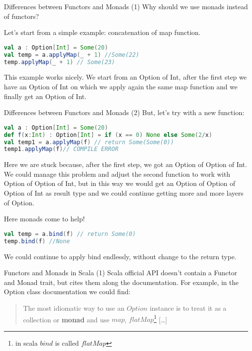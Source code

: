 \begin{frame}[fragile]{Differences between Functors and Monads (1)}
	Why should we use monads instead of functors?
	
	Let's start from a simple example: concatenation of map function.
\begin{lstlisting}[language=scala]
val a : Option[Int] = Some(20)
val temp = a.applyMap(_ + 1) //Some(22)
temp.applyMap(_ + 1) // Some(23)
\end{lstlisting}				
	This example works nicely. We start from an Option of Int, after the first step we have an Option of Int on which we apply again 
	the same map function and we finally get an Option of Int.
\end{frame}

\begin{frame}[fragile]{Differences between Functors and Monads (2)}
	But, let's try with a new function:
\begin{lstlisting}[language=scala]
val a : Option[Int] = Some(20)		
def f(x:Int) : Option[Int] = if (x == 0) None else Some(2/x)
val temp1 = a.applyMap(f) // return Some(Some(0))
temp1.applyMap(f)// COMPILE ERROR
\end{lstlisting}	
	Here we are stuck because, after the first step, we got an Option of Option of Int. 
	We could manage this problem and adjust the second function	to work with Option of Option of Int, 
	but in this way we would get an Option of Option of Option of Int as result type and we could continue getting more and more layers of Option.
	
	\pause
	
	Here monads come to help!
\begin{lstlisting}[language=scala]
val temp = a.bind(f) // return Some(0)
temp.bind(f) //None
\end{lstlisting}	
	We could continue to apply bind endlessly, without change to the return type.
\end{frame}

\begin{frame}[fragile]{Functors and Monads in Scala (1)}
	Scala official API doesn't contain a Functor and Monad trait, but cites them along the documentation.
	For example, in the Option class documentation we could find:
	\begin{quotation}
		The most idiomatic way to use an $Option$ instance is to treat it as a collection or \textbf{monad} and use $map$, $flatMap$\footnote{in scala $bind$ is called $flatMap$} [\dots]
	\end{quotation}	
\end{frame}

